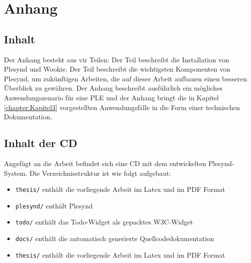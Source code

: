 \chapter{Anhang} \label{AppendixA}

\section{Inhalt} 
Der Anhang besteht aus vir Teilen: Der Teil  beschreibt die Installation von Plesynd und Wookie. Der Teil  beschreibt die wichtigsten Komponenten von Plesynd, um zukünftigen Arbeiten, die auf dieser Arbeit aufbauen einen besseren Überblick zu gewähren. Der Anhang  beschreibt ausführlich ein mögliches Anwendungszenario für eine PLE und der Anhang  bringt die in Kapitel \ref{chapter:Kapitel3} vorgestellten Anwendungsfälle in die Form einer technischen Dokumentation.

\section{Inhalt der CD}
Angefügt an die Arbeit befindet sich eine CD mit dem entwickelten Plesynd-System. Die Verzeichnisstruktur ist wie folgt aufgebaut:
\begin{itemize}
 \item \texttt{thesis/} enthält die vorliegende Arbeit im Latex und im PDF Format
 \item \texttt{plesynd/} enthält Plesynd
 \item \texttt{todo/} enthält das Todo-Widget als gepacktes W3C-Widget
 \item \texttt{docs/} enthält die automatisch generierte Quellcodedokumentation
 \item \texttt{thesis/} enthält die vorliegende Arbeit im Latex und im PDF Format
\end{itemize}

